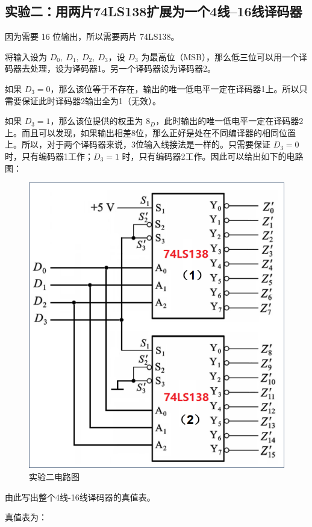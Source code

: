 \documentclass[a4paper,11pt,UTF8]{ctexart}
\begin{document}
\subsection{实验二：用两片74LS138扩展为一个4线–16线译码器}
	\par 因为需要 16 位输出，所以需要两片 74LS138。
	\par 将输入设为 $D_0,~D_1,~D_2,~D_3$，设 $D_3$ 为最高位（MSB），那么低三位可以用一个译码器去处理，设为译码器1。另一个译码器设为译码器2。
	\par 如果 $D_3=0$，那么该位等于不存在，输出的唯一低电平一定在译码器1上。所以只需要保证此时译码器2输出全为1（无效）。
	\par 如果 $D_3=1$，那么该位提供的权重为 $8_D$，此时输出的唯一低电平一定在译码器2上。而且可以发现，如果输出相差8位，那么正好是处在不同编译器的相同位置上。所以，对于两个译码器来说，3位输入线接法是一样的。只需要保证 $D_3=0$ 时，只有编码器1工作；$D_3=1$ 时，只有编码器2工作。因此可以给出如下的电路图：
	\begin{figure}[H]
	 \centering
	 \includegraphics[width=0.5\linewidth]{Exp02}
	 \caption{实验二电路图}
	 \label{fig:exp02}
	\end{figure}
	\par 由此写出整个4线-16线译码器的真值表。
	\par 真值表为：
\end{document}
